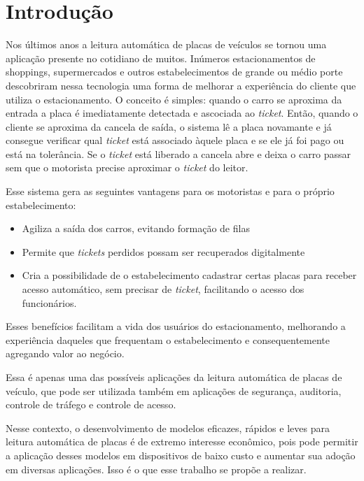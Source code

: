 \chapter{Introdução}

Nos últimos anos a leitura automática de placas de veículos se tornou uma aplicação presente no cotidiano de muitos. Inúmeros estacionamentos de shoppings, supermercados e outros estabelecimentos de grande ou médio porte descobriram nessa tecnologia uma forma de melhorar a experiência do cliente que utiliza o estacionamento. O conceito é simples: quando o carro se aproxima da entrada a placa é imediatamente detectada e ascociada ao \textit{ticket}. Então, quando o cliente se aproxima da cancela de saída, o sistema lê a placa novamante e já consegue verificar qual \textit{ticket} está associado àquele placa e se ele já foi pago ou está na tolerância. Se o \textit{ticket} está liberado a cancela abre e deixa o carro passar sem que o motorista precise aproximar o \textit{ticket} do leitor.

Esse sistema gera as seguintes vantagens para os motoristas e para o próprio estabelecimento:

\begin{itemize}
	\item Agiliza a saída dos carros, evitando  formação de filas
	\item Permite que \textit{tickets} perdidos possam ser recuperados digitalmente
	\item Cria a possibilidade de o estabelecimento cadastrar certas placas para receber acesso automático, sem precisar de \textit{ticket}, facilitando o acesso dos funcionários.
\end{itemize}

Esses benefícios facilitam a vida dos usuários do estacionamento, melhorando a experiência daqueles que frequentam o estabelecimento e consequentemente agregando valor ao negócio.

Essa é apenas uma das possíveis aplicações da leitura automática de placas de veículo, que pode ser utilizada também em aplicações de segurança, auditoria, controle de tráfego e controle de acesso.

Nesse contexto, o desenvolvimento de modelos eficazes, rápidos e leves para leitura automática de placas é de extremo interesse econômico, pois pode permitir a aplicação desses modelos em dispositivos de baixo custo e aumentar sua adoção em diversas aplicações. Isso é o que esse trabalho se propõe a realizar.

